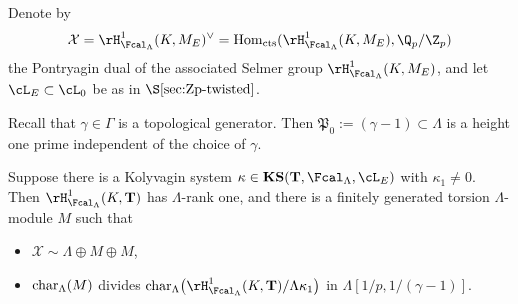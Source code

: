 Denote by
\[
\mathcal{X}=\rH^1_{\Fcal_\Lambda}(K,M_E)^\vee={\rm Hom}_{\rm cts}(\rH^1_{\Fcal_\Lambda}(K,M_E),\Q_p/\Z_p)
\]
the Pontryagin dual of the
associated Selmer group $\rH^1_{\Fcal_\Lambda}(K,M_E)$, and let $\cL_E\subset\cL_0$ be as in $\S\ref{sec:Zp-twisted}$.

Recall that $\gamma\in \Gamma$ is a topological generator. Then $\mathfrak{P}_0:=(\gamma-1)\subset \Lambda$ is a height one prime independent of the choice of $\gamma$.

\begin{theorem}
\notready\label{thm:howard}
Suppose there is a Kolyvagin system $\kappa\in\mathbf{KS}(\mathbf{T},\Fcal_\Lambda,\cL_E)$ with $\kappa_1\neq 0$. Then $\rH^1_{\Fcal_\Lambda}(K,\mathbf{T})$ has $\Lambda$-rank one, and there is a finitely generated torsion $\Lambda$-module $M$ such that
\begin{itemize}
\item[(i)] $\mathcal{X}\sim\Lambda\oplus M\oplus M$,
\item[(ii)] ${\rm char}_\Lambda(M)$ divides ${\rm char}_\Lambda\bigl(\rH^1_{\Fcal_\Lambda}(K,\mathbf{T})/\Lambda\kappa_1\bigr)$ in $\Lambda[1/p,1/(\gamma-1)]$.
\end{itemize}
\end{theorem}

